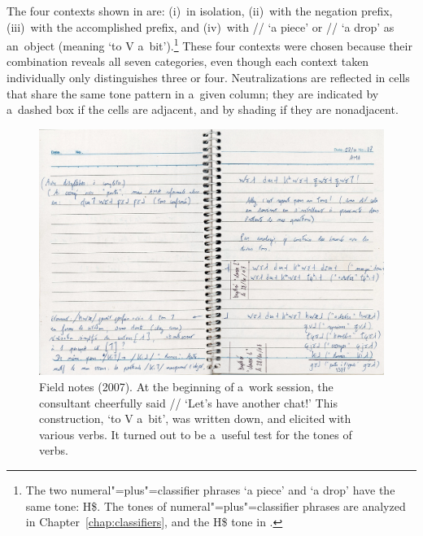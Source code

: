 The four contexts shown in  are: (i)~in isolation, (ii)~with the {negation} prefix, (iii)~with the {accomplished} prefix, and (iv)~with // ‘a piece’ or
// ‘a drop’ as an~object (meaning ‘to V a~bit’).\footnote{The two {numeral}"=plus"=classifier phrases ‘a
	piece’ and ‘a drop’ have the same tone: H\$. The tones of
	{numeral}"=plus"=classifier phrases are analyzed in Chapter~\ref{chap:classifiers}, and the H\$ tone in .} These four contexts were chosen because their combination reveals all seven categories, even though
each context taken individually only distinguishes three or four. Neutralizations are reflected in cells that share the same tone pattern in a~given column; they are indicated by a~dashed box if the cells are adjacent, and by shading if they are nonadjacent. 

\begin{figure}[h!!]
	\includegraphics[width=\textwidth]{figures/ms/1027ABit.jpg}
	\caption{Field notes (2007). At the beginning of a~work session, the consultant cheerfully said // ‘Let's have another chat!’ This construction, ‘to V a~bit’, was written down, and elicited with various verbs. It turned out to be a~useful test for the tones of verbs.}
	\label{fig:msABIT}
\end{figure}

